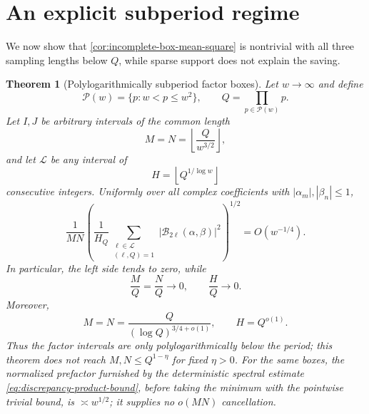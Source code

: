 \documentclass[11pt]{article}
\newtheorem{theorem}{Theorem}[section]
\theoremstyle{definition}
\theoremstyle{remark}
\newcommand{\cB}{\mathcal B}
\newcommand{\cL}{\mathcal L}
\newcommand{\cP}{\mathcal P}
\begin{document}
\section{An explicit subperiod regime}\label{sec:incomplete-regime}

We now show that \cref{cor:incomplete-box-mean-square} is nontrivial with all three sampling lengths below $Q$, while sparse support does not explain the saving.

\begin{theorem}[Polylogarithmically subperiod factor boxes]\label{thm:genuine-incomplete-regime}
Let $w\to\infty$ and define
\begin{equation}\label{eq:quadratic-prime-window}
 \cP(w)=\{p:w<p\le w^2\},
 \qquad
 Q=\prod_{p\in\cP(w)}p.
\end{equation}
Let $I,J$ be arbitrary intervals of the common length
\begin{equation}\label{eq:incomplete-box-length}
 M=N=\left\lfloor\frac{Q}{w^{3/2}}\right\rfloor,
\end{equation}
and let $\cL$ be any interval of
\begin{equation}\label{eq:incomplete-shift-length}
 H=\left\lfloor Q^{1/\log w}\right\rfloor
\end{equation}
consecutive integers.  Uniformly over all complex coefficients with $|\alpha_m|,|\beta_n|\le1$,
\begin{equation}\label{eq:genuine-incomplete-rms}
 \frac1{MN}
 \left(
  \frac1{H_Q}
  \sum_{\substack{\ell\in\cL\\(\ell,Q)=1}}
  |\cB_{2\ell}(\alpha,\beta)|^2
 \right)^{1/2}
 =O(w^{-1/4}).
\end{equation}
In particular, the left side tends to zero, while
\begin{equation}\label{eq:all-lengths-incomplete}
 \frac MQ=\frac NQ\to0,
 \qquad
 \frac HQ\to0.
\end{equation}
Moreover,
\begin{equation}\label{eq:factor-box-polylog-subperiod}
 M=N=\frac{Q}{(\log Q)^{3/4+o(1)}},
 \qquad H=Q^{o(1)}.
\end{equation}
Thus the factor intervals are only polylogarithmically below the period; this theorem does not reach $M,N\le Q^{1-\eta}$ for fixed $\eta>0$.  For the same boxes, the normalized prefactor furnished by the deterministic spectral estimate \eqref{eq:discrepancy-product-bound}, before taking the minimum with the pointwise trivial bound, is $\asymp w^{1/2}$; it supplies no $o(MN)$ cancellation.
\end{theorem}
\end{document}
